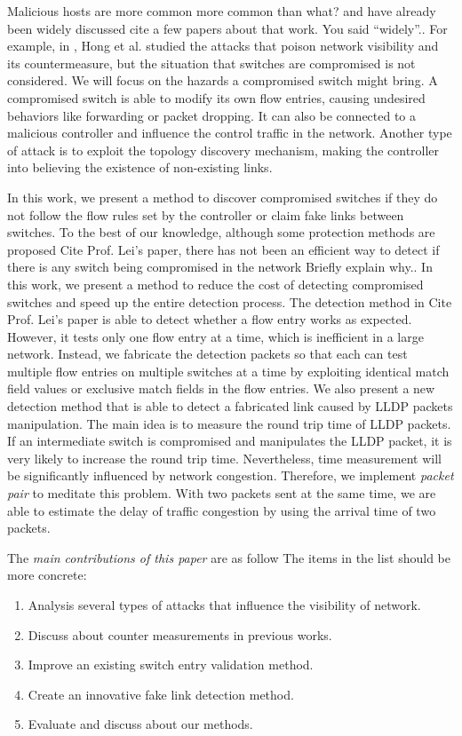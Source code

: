 Malicious hosts are more common {\color{red} more common than what?} and have already been widely discussed {\color{red} cite a few papers about that work. You said ``widely''.}. For example, in \cite{HXWG15}, Hong et al. studied the attacks that poison network visibility and its countermeasure, but the situation that switches are compromised is not considered. We will focus on the hazards a compromised switch might bring. A compromised switch is able to modify its own flow entries, causing undesired behaviors like forwarding or packet dropping. It can also be connected to a malicious controller and influence the control traffic in the network. Another type of attack is to exploit the topology discovery mechanism, making the controller into believing the existence of non-existing links. 

In this work, we present a method to discover compromised switches if they do not follow the flow rules set by the controller or claim fake links between switches. To the best of our knowledge, although some protection methods are proposed {\color{red} Cite Prof. Lei's paper}, there has not been an efficient way to detect if there is any switch being compromised in the network {\color{red} Briefly explain why.}. In this work, we present a method to reduce the cost of detecting compromised switches and speed up the entire detection process. The detection method in {\color{red} Cite Prof. Lei's paper} is able to detect whether a flow entry works as expected. However, it tests only one flow entry at a time, which is inefficient in a large network. Instead, we fabricate the detection packets so that each can test multiple flow entries on multiple switches at a time by exploiting identical match field values or exclusive match fields in the flow entries. We also present a new detection method that is able to detect a fabricated link caused by LLDP packets manipulation. The main idea is to measure the round trip time of LLDP packets. If an intermediate switch is compromised and manipulates the LLDP packet, it is very likely to increase the round trip time. Nevertheless, time measurement will be significantly influenced by network congestion. Therefore, we implement \textit{packet pair} to meditate this problem. With two packets sent at the same time, we are able to estimate the delay of traffic congestion by using the arrival time of two packets.

The \emph{main contributions of this paper} are as follow {\color{red} The items in the list should be more concrete}:
\begin{enumerate}
\item
Analysis several types of attacks that influence the visibility of network.
\item
Discuss about counter measurements in previous works.
\item
Improve an existing switch entry validation method.
\item
Create an innovative fake link detection method.
\item
Evaluate and discuss about our methods.
\end{enumerate}

